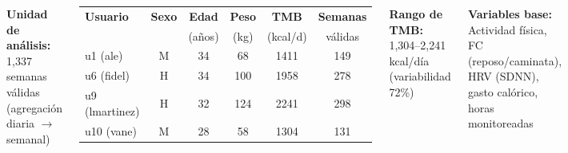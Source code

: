 \documentclass[25pt, a0paper, portrait]{tikzposter}
\begin{document}
\begin{columns}
{\textbf{Unidad de análisis:} 1,337 semanas válidas (agregación diaria $\rightarrow$ semanal)

\vspace{0.5cm}

\begin{center}
\begin{tabular}{lccccc}
\toprule
\textbf{Usuario} & \textbf{Sexo} & \textbf{Edad} & \textbf{Peso} & \textbf{TMB} & \textbf{Semanas} \\
 &  & (años) & (kg) & (kcal/d) & válidas \\
\midrule
u1 (ale) & M & 34 & 68 & 1411 & 149 \\
u6 (fidel) & H & 34 & 100 & 1958 & 278 \\
u9 (lmartinez) & H & 32 & 124 & 2241 & 298 \\
u10 (vane) & M & 28 & 58 & 1304 & 131 \\
\bottomrule
\end{tabular}
\end{center}

\vspace{0.5cm}

\textbf{Rango de TMB:} 1,304--2,241 kcal/día (variabilidad 72\%)

\textbf{Variables base:} Actividad física, FC (reposo/caminata), HRV (SDNN), gasto calórico, horas monitoreadas
}


\end{columns}
\end{document}
